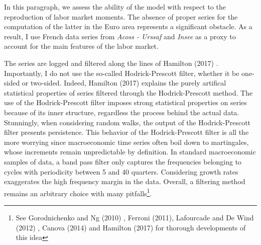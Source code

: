 \documentclass[a4paper]{article}
\begin{document}
In this paragraph, we assess the ability of the model with respect to the reproduction of labor market moments. The absence of proper series for the computation of the latter in the Euro area represents a significant obstacle. As a result, I use French data series from \textit{Acoss - Urssaf} and \textit{Insee} as a proxy to account for the main features of the labor market.

The series are logged and filtered along the lines of Hamilton (2017) \cite{hamilton2017you}. Importantly, I do not use the so-called Hodrick-Prescott filter, whether it be one-sided or two-sided. Indeed, Hamilton (2017) explains the purely artifical statistical properties of series filtered through the Hodrick-Prescott method. The use of the Hodrick-Prescott filter imposes strong statistical properties on series because of its inner structure, regardless the process behind the actual data. Stunningly, when considering random walks, the output of the Hodrick-Prescott filter presents persistence. This behavior of the Hodrick-Prescott filter is all the more worrying since macroeconomic time series often boil down to martingales, whose increments remain unpredictable by definition. In standard macroeconomic samples of data, a band pass filter only captures the frequencies belonging to cycles with periodicity between 5 and 40 quarters. Considering growth rates exaggerates the high frequency margin in the data. Overall, a filtering method remains an arbitrary choice with many pitfalls\footnote{See Gorodnichenko and Ng (2010) \cite{GORODNICHENKO2010325}, Ferroni (2011), Lafourcade and De Wind (2012) \cite{lafourcade2012taking}, Canova (2014) and Hamilton (2017) for thorough developments of this idea}.
\end{document}
